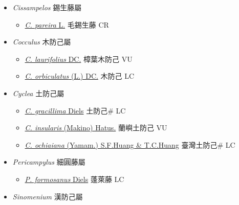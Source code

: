 
  \begin{itemize}
 \item[] \textit{Cissampelos} 錫生藤屬 
                    
  \begin{itemize}
        \item[] \href{http://www.theplantlist.org/tpl1.1/search?q=Cissampelos+pareira}{\textit{C. pareira} L.}   毛錫生藤 CR
  \end{itemize}
 \item[] \textit{Cocculus} 木防己屬
                    
  \begin{itemize}
        \item[] \href{http://www.theplantlist.org/tpl1.1/search?q=Cocculus+laurifolius}{\textit{C. laurifolius} DC.}   樟葉木防己 VU
        \item[] \href{http://www.theplantlist.org/tpl1.1/search?q=Cocculus+orbiculatus}{\textit{C. orbiculatus} (L.) DC.}   木防己 LC
  \end{itemize}
 \item[] \textit{Cyclea} 土防己屬
                    
  \begin{itemize}
        \item[] \href{http://www.theplantlist.org/tpl1.1/search?q=Cyclea+gracillima}{\textit{C. gracillima} Diels}   土防己\# LC
        \item[] \href{http://www.theplantlist.org/tpl1.1/search?q=Cyclea+insularis}{\textit{C. insularis} (Makino) Hatus.}   蘭嶼土防己 VU
        \item[] \href{http://www.theplantlist.org/tpl1.1/search?q=Cyclea+ochiaiana}{\textit{C. ochiaiana} (Yamam.) S.F.Huang \& T.C.Huang}   臺灣土防己\# LC
  \end{itemize}
 \item[] \textit{Pericampylus} 細圓藤屬
                    
  \begin{itemize}
        \item[] \href{http://www.theplantlist.org/tpl1.1/search?q=Pericampylus+formosanus}{\textit{P. formosanus} Diels}   蓬萊藤 LC
  \end{itemize}
 \item[] \textit{Sinomenium} 漢防己屬
                    

\end{itemize}

